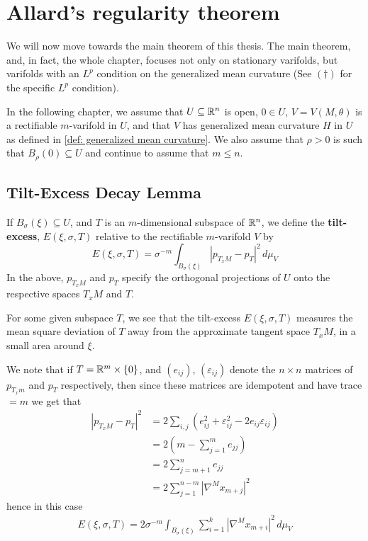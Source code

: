 \chapter{Allard's regularity theorem}

We will now move towards the main theorem of this thesis. The main theorem, and, in fact, the whole chapter, focuses not only on stationary varifolds, but varifolds with an $L^p$ condition on the generalized mean curvature (See $(\dagger)$ for the specific $L^p$ condition).

In the following chapter, we assume that $U \subseteq \mathbb{R}^n$ is open, $0 \in U$, $V=V(M, \theta)$ is a rectifiable $m$-varifold in $U$, and that $V$ has generalized mean curvature $H$ in $U$ as defined in \cref{def: generalized mean curvature}. We also assume that $\rho > 0$ is such that $B_{\rho}(0) \subseteq U$ and continue to assume that $m \le n$.

\section{Tilt-Excess Decay Lemma}
\begin{definition}
If $B_{\sigma}(\xi) \subseteq U$, and $T$ is an $m$-dimensional subspace of $\mathbb{R}^n$, we define the \textbf{tilt-excess}, $E(\xi, \sigma, T)$ relative to the rectifiable $m$-varifold $V$ by
\[
    E(\xi, \sigma, T) = \sigma^{-m} \int_{B_{\sigma}(\xi) } |p_{T_xM} - p_T|^2 \, d\mu_V
\]
In the above, $p_{T_xM}$ and $p_T$ specify the orthogonal projections of $U$ onto the respective spaces $T_xM$ and $T$.
\end{definition}

For some given subspace $T$, we see that the tilt-excess $E(\xi, \sigma, T)$ measures the mean square deviation of $T$ away from the approximate tangent space $T_xM$, in a small area around $\xi$.

We note that if $T=\mathbb{R}^m \times \{0\}$, and $(e_{ij})$, $(\varepsilon_{ij})$ denote the $n \times n$ matrices of $p_{T_xm}$ and $p_{T}$ respectively, then since these matrices are idempotent and have trace $=m$ we get that
\begin{align*}
    |p_{T_xM} - p_T|^2 &= 2\sum_{i,j}(e_{ij}^2 + \varepsilon_{ij}^2 - 2e_{ij}\varepsilon_{ij}) \\
    &= 2(m-\sum_{j=1}^m e_{jj}) \\
    &= 2\sum_{j=m+1}^n e_{jj} \\
    &= 2\sum_{j=1}^{n-m} |\nabla^M x_{m+j}|^2
\end{align*}
hence in this case
\begin{align}
    E(\xi, \sigma,T) = 2\sigma^{-m}\int_{B_{\sigma}(\xi)} \sum_{i=1}^k \left|\nabla^M x_{m+i}\right|^2 \, d\mu_V \label{eq: 4.3}
\end{align}


